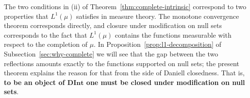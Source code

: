 \begin{remark}
  The two conditions in (ii) of Theorem~\ref{thm:complete-intrinsic} correspond
  to two properties that $L^1(\mu)$ satisfies in measure theory.
  The monotone convergence theorem corresponds directly, and closure under
  modification on null sets corresponds to the fact that $L^1(\mu)$ contains the
  functions measurable with respect to the completion of $\mu$.
  In Proposition~\ref{prop:l1-decomposition} of
  Subsection~\ref{sec:why-complete} we will see that the gap between the two
  reflections amounts exactly to the functions supported on null sets; the
  present theorem explains the reason for that from the side of Daniell
  closedness.
  That is, \textbf{to be an object of $\mathbf{DInt}$ one must be closed under
  modification on null sets}.
\end{remark}


